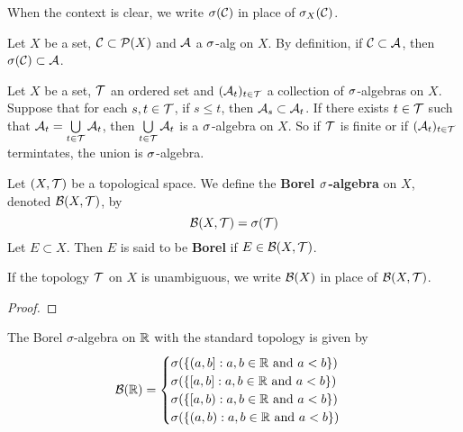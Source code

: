 \documentclass{book}
\begin{document}
	\begin{note}
		When the context is clear, we write $\sigma(\mathcal{C})$ in place of $\sigma_X(\mathcal{C})$.
	\end{note}
	
	\begin{note}
		Let $X$ be a set, $\mathcal{C} \subset \mathcal{P}(X)$ and $\mathcal{A}$ a $\sigma$-alg on $X$. By definition, if $\mathcal{C} \subset \mathcal{A}$, then $\sigma(\mathcal{C}) \subset \mathcal{A}$.
	\end{note}
	
	\begin{note}
		Let $X$ be a set, $\mathcal{T}$ an ordered set and $(\mathcal{A}_t)_{t\in \mathcal{T}}$ a collection of $\sigma$-algebras on $X$. Suppose that for each $s,t \in \mathcal{T}$, if $s \leq t$, then $\mathcal{A}_s \subset \mathcal{A}_t$. If there exists $t \in \mathcal{T}$ such that $\mathcal{A}_t = \bigcup\limits_{t \in \mathcal{T}}\mathcal{A}_t$, then $\bigcup\limits_{t \in \mathcal{T}}\mathcal{A}_t$ is a $\sigma$-algebra on $X$. So if $\mathcal{T}$ is finite or if $(\mathcal{A}_t)_{t \in \mathcal{T}}$ termintates, the union is $\sigma$-algebra.
	\end{note}
	
	\begin{defn}  
		Let $(X,\mathcal{T})$ be a topological space. We define the \textbf{Borel $\sigma$-algebra} on $X$, denoted $\mathcal{B}(X, \mathcal{T})$, by 
		$$\mathcal{B}(X, \mathcal{T}) = \sigma(\mathcal{T})$$  
		Let $E \subset X$. Then $E$ is said to be \textbf{Borel} if $E \in \mathcal{B}(X, \mathcal{T})$.
	\end{defn}

	\begin{note}
		If the topology $\mathcal{T}$ on $X$ is unambiguous, we write $\mathcal{B}(X)$ in place of $\mathcal{B}(X, \mathcal{T})$.
	\end{note}

	\begin{ex}
		\tcr{Show that $\MB(\ol{\R}) = \sig((\al, \infty]: \al \in \R)$ and similar}
	\end{ex}

	\begin{proof}
		\tcr{FINISH!!!}
	\end{proof}
	
	\begin{ex} \lex{00000} 
		The Borel $\sigma$-algebra on $\mathbb{R}$ with the standard topology is given by 
		\[
		\mathcal{B}(\mathbb{R}) =
		\begin{cases}
			\sigma(\{(a,b]:a,b \in \mathbb{R} \text{ and } a<b\}) \\
			\sigma(\{[a,b]:a,b \in \mathbb{R} \text{ and } a<b\}) \\
			\sigma(\{[a,b):a,b \in \mathbb{R} \text{ and } a<b\}) \\
			\sigma(\{(a,b):a,b \in \mathbb{R} \text{ and } a<b\}) \\
		\end{cases}
		\]
	\end{ex}
	
\end{document}

